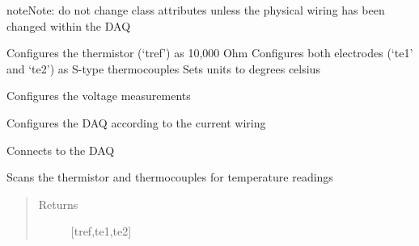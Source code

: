 \documentclass[letterpaper,10pt,english]{sphinxmanual}
\begin{document}
\begin{fulllineitems}
\begin{sphinxadmonition}{note}{Note:}
do not change class attributes unless the physical wiring has been changed within the DAQ
\end{sphinxadmonition}

\begin{fulllineitems}
\label{\detokenize{drivers:drivers.DAQ._config_temp}}
Configures the thermistor (‘tref’) as 10,000 Ohm
Configures both electrodes (‘te1’ and ‘te2’) as S-type thermocouples
Sets units to degrees celsius

\end{fulllineitems}


\begin{fulllineitems}
\label{\detokenize{drivers:drivers.DAQ._config_volt}}
Configures the voltage measurements

\end{fulllineitems}


\begin{fulllineitems}
\label{\detokenize{drivers:drivers.DAQ.configure}}
Configures the DAQ according to the current wiring

\end{fulllineitems}


\begin{fulllineitems}
\label{\detokenize{drivers:drivers.DAQ.connect}}
Connects to the DAQ

\end{fulllineitems}


\begin{fulllineitems}
\label{\detokenize{drivers:drivers.DAQ.get_temp}}
Scans the thermistor and thermocouples for temperature readings
\begin{quote}\begin{description}
\item[{Returns}] \leavevmode
{[}tref,te1,te2{]}


\end{description}
\end{quote}
\end{fulllineitems}
\end{fulllineitems}
\end{document}
